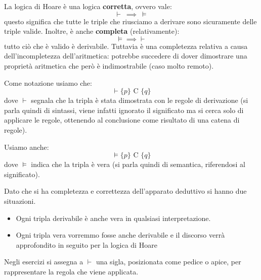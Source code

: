 La logica di Hoare è una logica \textbf{corretta}, ovvero vale:
\begin{equation}
    \vdash \ \implies \ \models
\end{equation}
questo significa che tutte le triple che riusciamo a derivare sono sicuramente
delle triple valide. Inoltre, è anche \textbf{completa} (relativamente):
\begin{equation}
    \models \implies \vdash
\end{equation}
tutto ciò che è valido è derivabile. Tuttavia è una completezza relativa a causa
dell'incompletezza dell'aritmetica: potrebbe succedere di dover dimostrare una
proprietà aritmetica che però è indimostrabile (caso molto remoto).

Come notazione usiamo che:
\begin{equation}
    \vdash \{p\} \text{ C } \{q\}
\end{equation}
dove $\vdash$ segnala che la tripla è stata dimostrata con le regole di
derivazione (si parla quindi di sintassi, viene infatti ignorato il significato
ma si cerca solo di applicare le regole, ottenendo al conclusione come risultato
di una catena di regole).

Usiamo anche:
\begin{equation}
    \models \{p\} \text{ C } \{q\}
\end{equation}
dove $\models$ indica che la tripla è vera (si parla quindi di semantica,
riferendosi al significato).

Dato che si ha completezza e correttezza dell'apparato deduttivo si hanno due
situazioni.
\begin{itemize}
    \item Ogni tripla derivabile è anche vera in qualsiasi interpretazione.
    \item Ogni tripla vera vorremmo fosse anche derivabile e il discorso verrà
          approfondito in seguito per la logica di Hoare
\end{itemize}
\begin{nota}
    Negli esercizi si assegna a $\vdash$ una sigla, posizionata come pedice o
    apice, per rappresentare la regola che viene applicata.
\end{nota}
